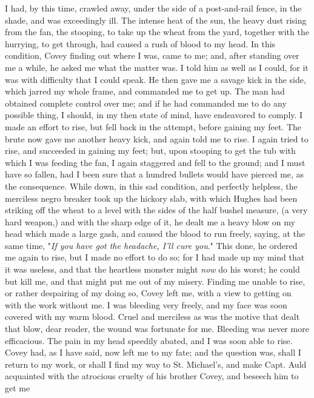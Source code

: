 I had, by this time, crawled away, under the side of a post-and-rail
fence, in the shade, and was exceedingly ill. The intense heat of the
sun, the heavy dust rising from the fan, the stooping, to take up the
wheat from the yard, together with the hurrying, to get through, had
caused a rush of blood to my head. In this condition, Covey finding out
where I was, came {\protect\hypertarget{225}{}{}}to me; and, after
standing over me a while, he asked me what the matter was. I told him as
well as I could, for it was with difficulty that I could speak. He then
gave me a savage kick in the side, which jarred my whole frame, and
commanded me to get up. The man had obtained complete control over me;
and if he had commanded me to do any possible thing, I should, in my
then state of mind, have endeavored to comply. I made an effort to rise,
but fell back in the attempt, before gaining my feet. The brute now gave
me another heavy kick, and again told me to rise. I again tried to rise,
and succeeded in gaining my feet; but, upon stooping to get the tub with
which I was feeding the fan, I again staggered and fell to the ground;
and I must have so fallen, had I been sure that a hundred bullets would
have pierced me, as the consequence. While down, in this sad condition,
and perfectly helpless, the merciless negro breaker took up the hickory
slab, with which Hughes had been striking off the wheat to a level with
the sides of the half bushel measure, (a very hard weapon,) and with the
sharp edge of it, he dealt me a heavy blow on my head which made a large
gash, and caused the blood to run freely, saying, at the same time,
"\emph{If you have got the headache, I'll cure you}." This done, he
ordered me again to rise, but I made no effort to do so; for I had made
up my mind that it was useless, and that the heartless monster might
\emph{now} do his worst; he could but kill me, and that might put me out
of my misery. Finding me unable to rise, or rather despairing of my
doing so, Covey left me, with a view to getting on with the work without
me. I {\protect\hypertarget{226}{}{}}was bleeding very freely, and my
face was soon covered with my warm blood. Cruel and merciless as was the
motive that dealt that blow, dear reader, the wound was fortunate for
me. Bleeding was never more efficacious. The pain in my head speedily
abated, and I was soon able to rise. Covey had, as I have said, now left
me to my fate; and the question was, shall I return to my work, or shall
I find my way to St. Michael's, and make Capt. Auld acquainted with the
atrocious cruelty of his brother Covey, and beseech him to get me
